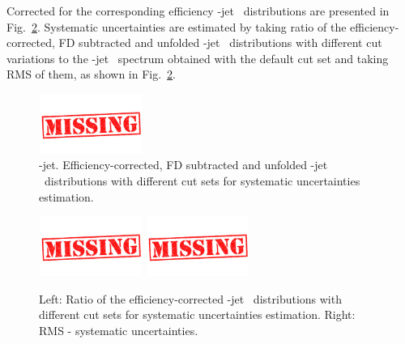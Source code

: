 Corrected for the corresponding efficiency \Dzero-jet \ptchjet\ distributions are presented in Fig.~\ref{fig:JetPtSys_Dzero}. Systematic uncertainties are estimated by taking ratio of the efficiency-corrected, FD subtracted and unfolded \Dzero-jet \ptchjet\ distributions with different cut variations to the \Dzero-jet \pt\ spectrum obtained with the default cut set and taking RMS of them, as shown in Fig.~\ref{fig:JetPtSys_Dzero}.

\begin{figure}[bth]
\begin{center}
\includegraphics[width=0.3\textwidth]{missing}
\caption{\Dzero-jet. Efficiency-corrected, FD subtracted and unfolded \Dzero-jet \pt\ distributions with different cut sets for systematic uncertainties estimation.} 
\label{fig:JetPtSys_Dzero}
\end{center}
\end{figure}

\begin{figure}[bth]
\begin{center}
\includegraphics[width=0.3\textwidth]{missing}
\includegraphics[width=0.3\textwidth]{missing}
\caption{Left: Ratio of the efficiency-corrected \Dstar-jet \pt\ distributions with different cut sets for systematic uncertainties estimation. Right: RMS - systematic uncertainties.} 
\label{fig:JetPtSys_Dzero}
\end{center}
\end{figure}


